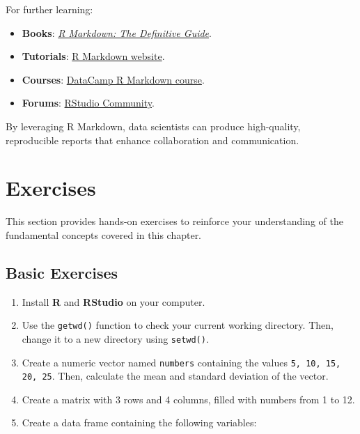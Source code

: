 \documentclass[
]{book}
\newcommand{\passthrough}[1]{#1}
\providecommand{\tightlist}{%
  \setlength{\itemsep}{0pt}\setlength{\parskip}{0pt}}
\theoremstyle{definition}
\theoremstyle{definition}
\theoremstyle{definition}
\theoremstyle{definition}
\theoremstyle{remark}
\begin{document}
For further learning:

\begin{itemize}
\tightlist
\item
  \textbf{Books}: \href{https://bookdown.org/yihui/rmarkdown/}{\emph{R Markdown: The Definitive Guide}}.\\
\item
  \textbf{Tutorials}: \href{https://rmarkdown.rstudio.com/lesson-1.html}{R Markdown website}.\\
\item
  \textbf{Courses}: \href{https://www.datacamp.com/courses/reporting-with-r-markdown}{DataCamp R Markdown course}.\\
\item
  \textbf{Forums}: \href{https://community.rstudio.com/c/rmarkdown/9}{RStudio Community}.
\end{itemize}

By leveraging R Markdown, data scientists can produce high-quality, reproducible reports that enhance collaboration and communication.

\section{Exercises}\label{exercises}

This section provides hands-on exercises to reinforce your understanding of the fundamental concepts covered in this chapter.

\subsection*{Basic Exercises}\label{basic-exercises}

\begin{enumerate}
\def\labelenumi{\arabic{enumi}.}
\tightlist
\item
  Install \textbf{R} and \textbf{RStudio} on your computer.\\
\item
  Use the \passthrough{\lstinline!getwd()!} function to check your current working directory. Then, change it to a new directory using \passthrough{\lstinline!setwd()!}.\\
\item
  Create a numeric vector named \passthrough{\lstinline!numbers!} containing the values \passthrough{\lstinline!5, 10, 15, 20, 25!}. Then, calculate the mean and standard deviation of the vector.\\
\item
  Create a matrix with 3 rows and 4 columns, filled with numbers from 1 to 12.\\
\item
  Create a data frame containing the following variables:\\
\end{enumerate}
\end{document}
